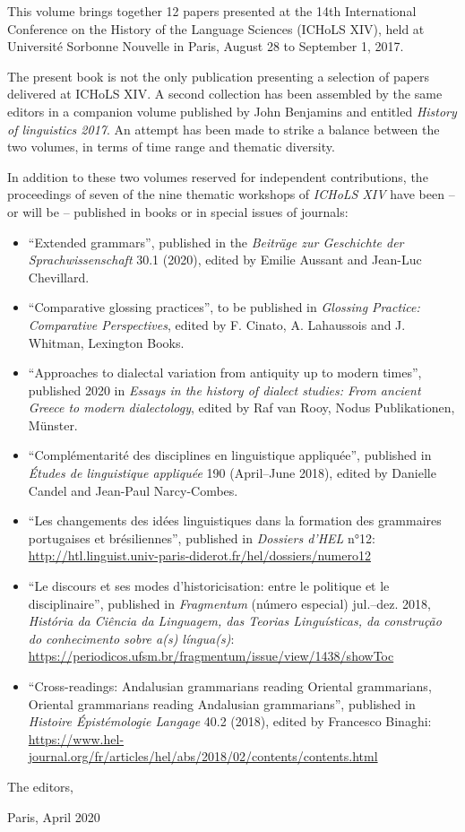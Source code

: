 This volume brings together 12 papers presented at the 14th International Conference on the History of the Language Sciences (ICHoLS XIV), held at Université Sorbonne Nouvelle in Paris, August 28 to September 1, 2017.

The present book is not the only publication presenting a selection of papers delivered at ICHoLS XIV. A second collection has been assembled by the same editors in a companion volume published by John Benjamins and entitled \emph{History of linguistics 2017}. An attempt has been made to strike a balance between the two volumes, in terms of time range and thematic diversity.

In addition to these two volumes reserved for independent contributions, the proceedings of seven of the nine thematic workshops of \emph{ICHoLS XIV} have been -- or will be -- published in books or in special issues of journals:

\begin{itemize}
    \item ``Extended grammars'', published in the \emph{Beiträge zur Geschichte der Sprachwissenschaft} 30.1 (2020), edited by Emilie Aussant and Jean-Luc Chevillard.
    
    \item ``Comparative glossing practices'', to be published in \emph{Glossing Practice: Comparative Perspectives}, edited by F. Cinato, A. Lahaussois and J. Whitman, Lexington Books.
    
    \item ``Approaches to dialectal variation from antiquity up to modern times'', published 2020 in \emph{Essays in the history of dialect studies: From ancient Greece to modern dialectology}, edited by Raf van Rooy, Nodus Publikationen, Münster.
    
    \item ``Complémentarité des disciplines en linguistique appliquée'', published in \emph{Études de linguistique appliquée} 190 (April--June 2018), edited by Danielle Candel and Jean-Paul Narcy-Combes.
    
    \item ``Les changements des idées linguistiques dans la formation des grammaires portugaises et brésiliennes'', published in \emph{Dossiers d'HEL} n°12: \url{http://htl.linguist.univ-paris-diderot.fr/hel/dossiers/numero12}
    
    \item ``Le discours et ses modes d’historicisation: entre le politique et le disciplinaire'', published in \emph{Fragmentum} (número especial) jul.--dez. 2018, \emph{História da Ciência da Linguagem, das Teorias Linguísticas, da construção do conhecimento sobre a(s) língua(s)}: \url{https://periodicos.ufsm.br/fragmentum/issue/view/1438/showToc}
    
    \item ``Cross-readings: Andalusian grammarians reading Oriental grammarians, Oriental grammarians reading Andalusian grammarians'', published in \emph{Histoire Épistémologie Langage} 40.2 (2018), edited by Francesco Binaghi: \url{https://www.hel-journal.org/fr/articles/hel/abs/2018/02/contents/contents.html}
\end{itemize}

\begin{flushright}
The editors,

Paris, April 2020
\end{flushright}

